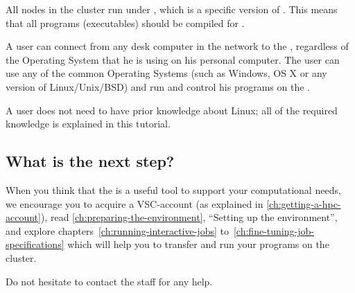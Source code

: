 All nodes in the \hpc cluster run under \operatingsystemSL, which is a specific
version of \operatingsystemRHEL. This means that all programs (executables)
should be compiled for \operatingsystemSL.

A user can connect from any desk computer in the \university network to the
\hpc, regardless of the Operating System that he is using on his personal
computer.
The user can use any of the common Operating Systems (such as Windows, OS X or
any version of Linux/Unix/BSD) and run and control his programs on the \hpc.

A user does not need to have prior knowledge about Linux; all of the required
knowledge is explained in this tutorial.

\subsection{What is the next step?}
\label{sec:what-is-the-next-step}

When you think that the \hpc is a useful tool to support your computational
needs, we encourage you to acquire a VSC-account (as explained in
\autoref{ch:getting-a-hpc-account}), read
\autoref{ch:preparing-the-environment}, ``Setting up the environment'', and
explore chapters~\ref{ch:running-interactive-jobs}
to~\ref{ch:fine-tuning-job-specifications} which will help you to transfer and
run your programs on the \hpc cluster.

Do not hesitate to contact the \hpc staff for any help.
